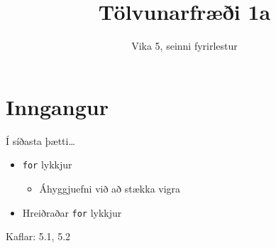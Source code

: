 \documentclass{beamer}
\title{Tölvunarfræði 1a}
\subtitle{Vika 5, seinni fyrirlestur}
\begin{document}
\begin{frame}
\titlepage
\end{frame}

\section{Inngangur}

\begin{frame}{Í síðasta þætti\ldots}
\begin{itemize}
 \item \texttt{for} lykkjur
 \begin{itemize}
  \item Áhyggjuefni við að stækka vigra
 \end{itemize}
 \item Hreiðraðar \texttt{for} lykkjur
\end{itemize}
Kaflar: 5.1, 5.2
\end{frame}
\end{document}
